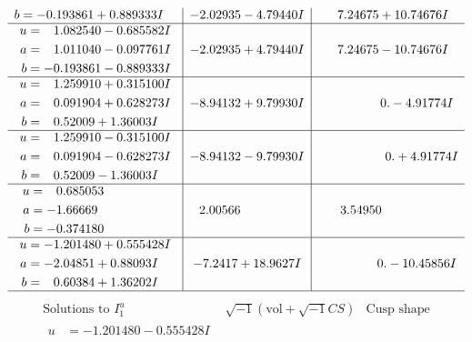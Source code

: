 \documentclass[1p]{elsarticle_modified}
\theoremstyle{definition}
\newcommand{\I}{\sqrt{-1}}
\begin{document}
$$\begin{array}{c|c|c}
\begin{aligned}
b &= -0.193861 + 0.889333 I\end{aligned}
 & -2.02935 - 4.79440 I & \phantom{-}7.24675 + 10.74676 I \\ \hline\begin{aligned}
u &= \phantom{-}1.082540 - 0.685582 I \\
a &= \phantom{-}1.011040 - 0.097761 I \\
b &= -0.193861 - 0.889333 I\end{aligned}
 & -2.02935 + 4.79440 I & \phantom{-}7.24675 - 10.74676 I \\ \hline\begin{aligned}
u &= \phantom{-}1.259910 + 0.315100 I \\
a &= \phantom{-}0.091904 + 0.628273 I \\
b &= \phantom{-}0.52009 + 1.36003 I\end{aligned}
 & -8.94132 + 9.79930 I & \phantom{-0.000000 } 0. - 4.91774 I \\ \hline\begin{aligned}
u &= \phantom{-}1.259910 - 0.315100 I \\
a &= \phantom{-}0.091904 - 0.628273 I \\
b &= \phantom{-}0.52009 - 1.36003 I\end{aligned}
 & -8.94132 - 9.79930 I & \phantom{-0.000000 -}0. + 4.91774 I \\ \hline\begin{aligned}
u &= \phantom{-}0.685053\phantom{ +0.000000I} \\
a &= -1.66669\phantom{ +0.000000I} \\
b &= -0.374180\phantom{ +0.000000I}\end{aligned}
 & \phantom{-}2.00566\phantom{ +0.000000I} & \phantom{-}3.54950\phantom{ +0.000000I} \\ \hline\begin{aligned}
u &= -1.201480 + 0.555428 I \\
a &= -2.04851 + 0.88093 I \\
b &= \phantom{-}0.60384 + 1.36202 I\end{aligned}
 & -7.2417 + 18.9627 I & \phantom{-0.000000 } 0. - 10.45856 I\\
 \hline 
 \end{array}$$\newpage$$\begin{array}{c|c|c}  
\text{Solutions to }I^u_{1}& \I (\text{vol} + \sqrt{-1}CS) & \text{Cusp shape}\\
 \hline 
\begin{aligned}
u &= -1.201480 - 0.555428 I \\

\end{aligned}
\end{array}$$
\end{document}
